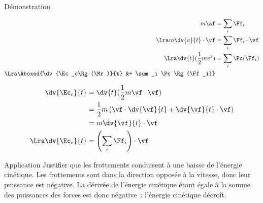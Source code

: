\documentclass[../main/main.tex]{subfiles}
\begin{document}
\begin{rdemoside}{Démonstration}
    \begin{center}
    \end{center}
    \vspace*{-15pt}
    \begin{align*}
        m\af &= \sum_i \Ff_i
        \\\Lra
        m \dv{v}{t}\cdot\vf &= \sum_i \Ff_i\cdot\vf
        \\\Lra
        \dv{t}(\frac{1}{2}mv^2) &= \sum_i \Pc(\Ff_i)
        \\\Lra
        \Aboxed{\dv{\Ec_c\Rg(\Mr)}{t} &= \sum_i \Pc\Rg(\Ff_i)}
    \end{align*}
    \tcblower
    \begin{center}
    \end{center}
    \vspace*{-15pt}
    \begin{align*}
        \dv{\Ec_c}{t} &= \dv{t}(\frac{1}{2}m\vf\cdot\vf)
        \\
                      &= \frac{1}{2}m \left( \vf\cdot \dv{\vf}{t} + \dv{\vf}{t}
                      \cdot \vf\right)
        \\
                      &= m\dv{\vf}{t}\cdot\vf
        \\\Lra
        \dv{\Ec_c}{t} &= \left( \sum_i \Ff_i \right)\cdot\vf
    \end{align*}
\end{rdemoside}


\begin{rexem}{Application}
    Justifier que les frottements conduisent à une baisse de l'énergie
    cinétique.
    \tcblower
    Les frottements sont dans la direction opposée à la vitesse, donc leur
    puissance est négative. La dérivée de l'énergie cinétique étant égale à la
    somme des puissances des forces est donc négative~: l'énergie cinétique
    décroît.
\end{rexem}
\end{document}
